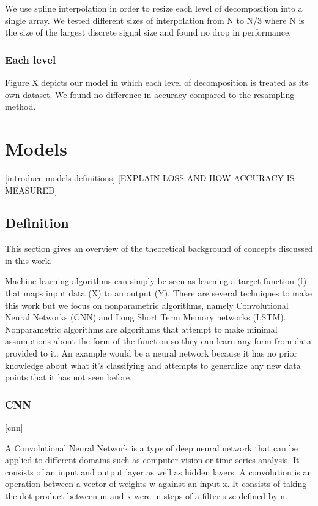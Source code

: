 \documentclass{turabian-thesis}
\begin{document}
We use spline interpolation in order to resize each level of decomposition into a single array. We tested different sizes of interpolation from N to N/3 where N is the size of the largest discrete signal size and found no drop in performance.

\subsection{Each level}
Figure {X} depicts our model in which each level of decomposition is treated as its own dataset. We found no difference in accuracy compared to the resampling method. 



\chapter{Models}
[introduce models definitions]
[EXPLAIN LOSS AND HOW ACCURACY IS MEASURED]


\section{Definition}
This section gives an overview of the theoretical background of concepts discussed in this work. 

Machine learning algorithms can simply be seen as learning a target function (f) that maps input data (X) to an output (Y). There are several techniques to make this work but we focus on nonparametric algorithms, namely Convolutional Neural Networks (CNN) and Long Short Term Memory networks (LSTM). Nonparametric algorithms are algorithms that attempt to make minimal assumptions about the form of the function so they can learn any form from data provided to it. An example would be a neural network because it has no prior knowledge about what it’s classifying and attempts to generalize any new data points that it has not seen before.


\subsection{CNN}
[cnn]

A Convolutional Neural Network is a type of deep neural network that can be applied to different domains such as computer vision or time series analysis. It consists of an input and output layer as well as hidden layers. A convolution is an operation between a vector of weights w against an input x. It consists of taking the dot product between m and x were in steps of a filter size defined by n.
\end{document}
